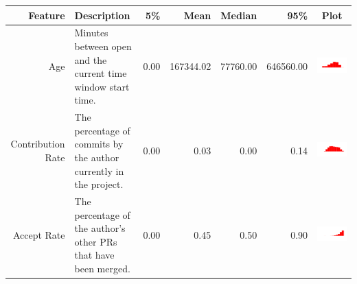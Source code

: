 \documentclass[conference]{IEEEtran}
\begin{document}
\begin{table}[ht]
  \centering
  \begin{tabular}{rp{26em}rrrrc}
    \hline
    \textbf{Feature} & \textbf{Description} & \textbf{5\%} & \textbf{Mean} & \textbf{Median} & \textbf{95\%} & \textbf{Plot} \\
    \hline
    Age & Minutes between open and the current time window start time. & 0.00 & 167344.02 & 77760.00 & 646560.00 & \includegraphics[scale = 0.1, clip = true, trim= 50px 60px 50px 60px]{../figs/hist-features/hist-age.pdf} \\
    Contribution Rate & The percentage of commits by the author currently in the project. & 0.00 & 0.03 & 0.00 & 0.14 & \includegraphics[scale = 0.1, clip = true, trim= 50px 60px 50px 60px]{../figs/hist-features/hist-commitRatio.pdf} \\
    Accept Rate & The percentage of the author's other PRs that have been merged. & 0.00 & 0.45 & 0.50 & 0.90 & \includegraphics[scale = 0.1, clip = true, trim= 50px 60px 50px 60px]{../figs/hist-features/hist-pullRequestRatio.pdf} \\

\end{tabular}
\end{table}
\end{document}
